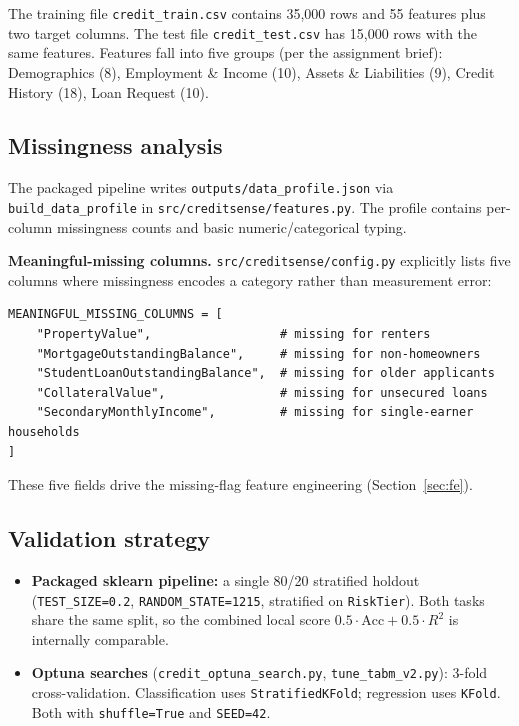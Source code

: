 \documentclass[11pt,a4paper]{article}
\begin{document}
The training file \texttt{credit\_train.csv} contains 35{,}000 rows and 55 features plus two target columns. The test file \texttt{credit\_test.csv} has 15{,}000 rows with the same features. Features fall into five groups (per the assignment brief): Demographics (8), Employment \& Income (10), Assets \& Liabilities (9), Credit History (18), Loan Request (10).

\subsection{Missingness analysis}

The packaged pipeline writes \texttt{outputs/data\_profile.json} via \texttt{build\_data\_profile} in \texttt{src/creditsense/features.py}. The profile contains per-column missingness counts and basic numeric/categorical typing.

\textbf{Meaningful-missing columns.} \texttt{src/creditsense/config.py} explicitly lists five columns where missingness encodes a category rather than measurement error:

\begin{lstlisting}
MEANINGFUL_MISSING_COLUMNS = [
    "PropertyValue",                  # missing for renters
    "MortgageOutstandingBalance",     # missing for non-homeowners
    "StudentLoanOutstandingBalance",  # missing for older applicants
    "CollateralValue",                # missing for unsecured loans
    "SecondaryMonthlyIncome",         # missing for single-earner households
]
\end{lstlisting}

These five fields drive the missing-flag feature engineering (Section~\ref{sec:fe}).

\subsection{Validation strategy}

\begin{itemize}[leftmargin=*,nosep]
  \item \textbf{Packaged sklearn pipeline:} a single 80/20 stratified holdout (\texttt{TEST\_SIZE=0.2}, \texttt{RANDOM\_STATE=1215}, stratified on \texttt{RiskTier}). Both tasks share the same split, so the combined local score $0.5 \cdot \text{Acc} + 0.5 \cdot R^2$ is internally comparable.
  \item \textbf{Optuna searches} (\texttt{credit\_optuna\_search.py}, \texttt{tune\_tabm\_v2.py}): 3-fold cross-validation. Classification uses \texttt{StratifiedKFold}; regression uses \texttt{KFold}. Both with \texttt{shuffle=True} and \texttt{SEED=42}.
\end{itemize}
\end{document}
